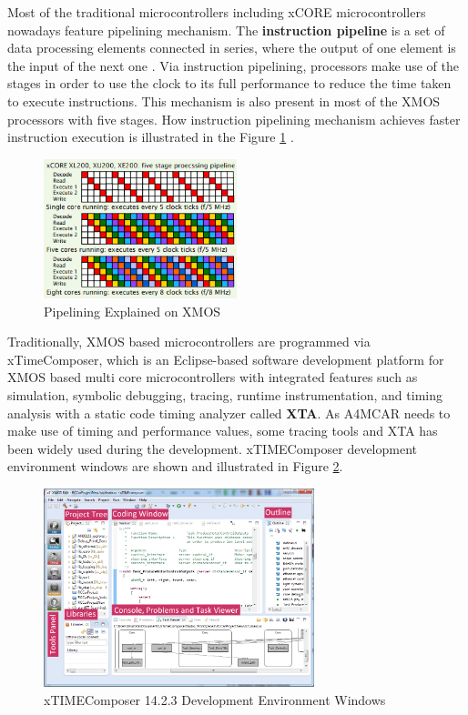 Most of the traditional microcontrollers including xCORE microcontrollers nowadays feature pipelining mechanism. The \textbf{instruction pipeline} is a set of data processing elements connected in series, where the output of one element is the input of the next one \cite{pipelinebook}. Via instruction pipelining, processors make use of the stages in order to use the clock to its full performance to reduce the time taken to execute instructions. This mechanism is also present in most of the XMOS processors with five stages. How instruction pipelining mechanism achieves faster instruction execution is illustrated in the Figure \ref{fig:pipeline} \cite{xmosflyer}.
\begin{figure}[!ht]
	\centering
	\includegraphics[width=0.5\textwidth]{content/images/pipeline.png}
	\caption{Pipelining Explained on XMOS \cite{xmosflyer}}
	\label{fig:pipeline}
\end{figure}

Traditionally, XMOS based microcontrollers are programmed via xTimeComposer, which is an Eclipse-based software development platform for XMOS based multi core microcontrollers with integrated features such as simulation, symbolic debugging, tracing, runtime instrumentation, and timing analysis with a static code timing analyzer called \textbf{XTA}\cite{xmosflyer}. As A4MCAR needs to make use of timing and performance values, some tracing tools and XTA has been widely used during the development. xTIMEComposer development environment windows are shown and illustrated in Figure \ref{fig:xtimecomposerwindows}.
\begin{figure}[!ht]
	\centering
	\includegraphics[width=0.7\textwidth]{content/images/xtimecomposerwindows.png}
	\caption{xTIMEComposer 14.2.3 Development Environment Windows}
	\label{fig:xtimecomposerwindows}
\end{figure} \\


